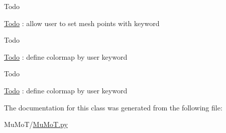 \begin{DoxyRefDesc}{Todo}
\item[\hyperlink{todo__todo000042}{Todo}]\+: allow user to set mesh points with keyword \end{DoxyRefDesc}
\begin{DoxyRefDesc}{Todo}
\item[\hyperlink{todo__todo000043}{Todo}]\+: define colormap by user keyword \end{DoxyRefDesc}
\begin{DoxyRefDesc}{Todo}
\item[\hyperlink{todo__todo000044}{Todo}]\+: define colormap by user keyword \end{DoxyRefDesc}


The documentation for this class was generated from the following file\+:\begin{DoxyCompactItemize}
\item 
Mu\+Mo\+T/\hyperlink{_mu_mo_t_8py}{Mu\+Mo\+T.\+py}\end{DoxyCompactItemize}
